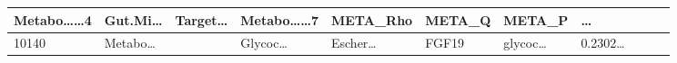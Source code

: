 \documentclass[
]{article}
\begin{document}
\begin{longtable}[]{@{}lllllllllll@{}}
\begin{minipage}[b]{0.09\columnwidth}
Metabo\ldots\ldots4\strut
\end{minipage} & \begin{minipage}[b]{0.07\columnwidth}\raggedright
Gut.Mi\ldots{}\strut
\end{minipage} & \begin{minipage}[b]{0.07\columnwidth}\raggedright
Target\ldots{}\strut
\end{minipage} & \begin{minipage}[b]{0.09\columnwidth}\raggedright
Metabo\ldots\ldots7\strut
\end{minipage} & \begin{minipage}[b]{0.07\columnwidth}\raggedright
META\_Rho\strut
\end{minipage} & \begin{minipage}[b]{0.07\columnwidth}\raggedright
META\_Q\strut
\end{minipage} & \begin{minipage}[b]{0.07\columnwidth}\raggedright
META\_P\strut
\end{minipage} & \begin{minipage}[b]{0.03\columnwidth}\raggedright
\ldots{}\strut
\end{minipage}\tabularnewline
\midrule
\endhead
\begin{minipage}[t]{0.05\columnwidth}\raggedright
10140\strut
\end{minipage} & \begin{minipage}[t]{0.07\columnwidth}\raggedright
Metabo\ldots{}\strut
\end{minipage} & \begin{minipage}[t]{0.07\columnwidth}\raggedright
\strut
\end{minipage} & \begin{minipage}[t]{0.09\columnwidth}\raggedright
Glycoc\ldots{}\strut
\end{minipage} & \begin{minipage}[t]{0.07\columnwidth}\raggedright
Escher\ldots{}\strut
\end{minipage} & \begin{minipage}[t]{0.07\columnwidth}\raggedright
FGF19\strut
\end{minipage} & \begin{minipage}[t]{0.09\columnwidth}\raggedright
glycoc\ldots{}\strut
\end{minipage} & \begin{minipage}[t]{0.07\columnwidth}\raggedright
0.2302\ldots{}\strut
\end{minipage} & \begin{minipage}[t]{0.07\columnwidth}\raggedright

\end{minipage}
\end{longtable}
\end{document}
